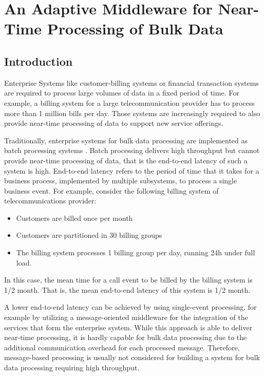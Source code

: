 \chapter{An Adaptive Middleware for Near-Time Processing of Bulk Data}\label{ch:adaptive_middleware}

\section{Introduction}\label{sec:introduction}
Enterprise Systems like customer-billing systems or financial transaction systems are required to process large volumes of data in a fixed period of time. For example, a billing system for a large telecommunication provider has to process more than 1 million bills per day.
Those systems are increasingly required to also provide near-time processing of data to support new service offerings.

Traditionally, enterprise systems for bulk data processing are implemented as batch processing systems \citep{Fleck:1999aa}. Batch processing delivers high throughput but cannot provide near-time processing of data, that is the end-to-end latency of such a system is high. End-to-end latency refers to the period of time that it takes for a business process, implemented by multiple subsystems, to process a single business event.  For example, consider the following billing system of telecommunications provider:
\begin{itemize}
	\item Customers are billed once per month
	\item Customers are partitioned in 30 billing groups
	\item The billing system processes 1 billing group per day, running 24h under full load.
\end{itemize}
In this case, the mean time for a call event to be billed by the billing system is 1/2 month. That is, the mean end-to-end latency of this system is 1/2 month.

A lower end-to-end latency can be achieved by using single-event processing, for example by utilizing a message-oriented middleware for the integration of the services that form the enterprise system. While this approach is able to deliver near-time processing, it is hardly capable for bulk data processing due to the additional communication overhead for each processed message. Therefore, message-based processing is usually not considered for building a system for bulk data processing requiring high throughput.

